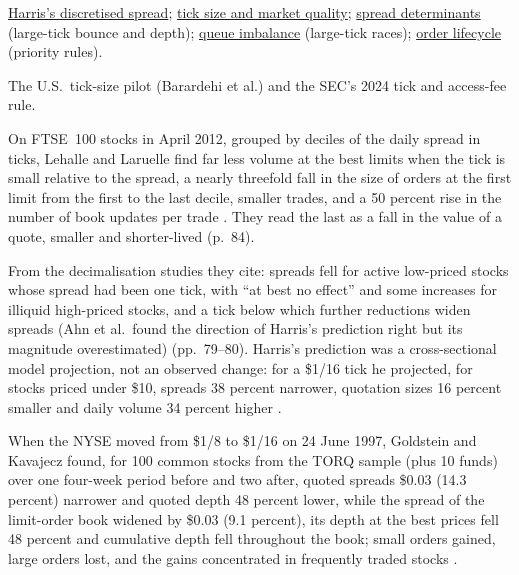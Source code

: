 \begin{qfdefinition}
 \hyperref[mod:harris-discretised-spread]{Harris's discretised spread}; \hyperref[ev:tick-size-market-quality]{tick size and market quality}; \hyperref[res:spread-determinants]{spread determinants} (large-tick bounce and depth); \hyperref[def:queue-imbalance]{queue imbalance} (large-tick races); \hyperref[mech:order-lifecycle]{order lifecycle} (priority rules).

 The U.S.\ tick-size pilot (Barardehi et al.) and the SEC's 2024 tick and access-fee rule.

\end{qfdefinition}

\begin{qfevidence}\label{ev:tick-size-market-quality}
 On FTSE~100 stocks in April 2012, grouped by deciles of the daily spread in ticks, Lehalle and Laruelle find far less volume at the best limits when the tick is small relative to the spread, a nearly threefold fall in the size of orders at the first limit from the first to the last decile, smaller trades, and a 50 percent rise in the number of book updates per trade \citep[chap.~1, sec.~1.3.2, Figures~1.21--1.24, pp.~80--84]{alpha-laruelle}. They read the last as a fall in the value of a quote, smaller and shorter-lived (p.~84).

From the decimalisation studies they cite: spreads fell for active low-priced stocks whose spread had been one tick, with ``at best no effect'' and some increases for illiquid high-priced stocks, and a tick below which further reductions widen spreads (Ahn et al.\ found the direction of Harris's prediction right but its magnitude overestimated) (pp.~79--80). Harris's prediction was a cross-sectional model projection, not an observed change: for a \$1/16 tick he projected, for stocks priced under \$10, spreads 38 percent narrower, quotation sizes 16 percent smaller and daily volume 34 percent higher \citep[p.~149]{harris-1994}.

When the NYSE moved from \$1/8 to \$1/16 on 24 June 1997, Goldstein and Kavajecz found, for 100 common stocks from the TORQ sample (plus 10 funds) over one four-week period before and two after, quoted spreads \$0.03 (14.3 percent) narrower and quoted depth 48 percent lower, while the spread of the limit-order book widened by \$0.03 (9.1 percent), its depth at the best prices fell 48 percent and cumulative depth fell throughout the book; small orders gained, large orders lost, and the gains concentrated in frequently traded stocks \citep[abstract and results, PDF pp.~2, 5 and~9--15]{goldstein-kavajecz-1998}.


\end{qfevidence}
